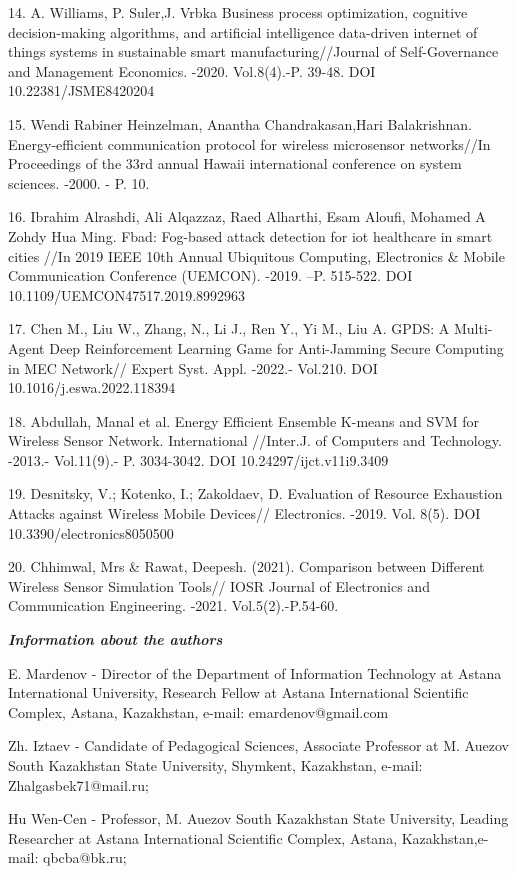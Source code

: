 14. A. Williams, P. Suler,J. Vrbka Business process optimization,
cognitive decision-making algorithms, and artificial intelligence
data-driven internet of things systems in sustainable smart
manufacturing//Journal of Self-Governance and Management Economics.
-2020. Vol.8(4).-P. 39-48. DOI 10.22381/JSME8420204

15. Wendi Rabiner Heinzelman, Anantha Chandrakasan,Hari Balakrishnan.
Energy-efficient communication protocol for wireless microsensor
networks//In Proceedings of the 33rd annual Hawaii international
conference on system sciences. -2000. - P. 10.

16. Ibrahim Alrashdi, Ali Alqazzaz, Raed Alharthi, Esam Aloufi, Mohamed
A Zohdy Hua Ming. Fbad: Fog-based attack detection for iot healthcare in
smart cities //In 2019 IEEE 10th Annual Ubiquitous Computing,
Electronics \& Mobile Communication Conference (UEMCON). -2019. --P.
515-522. DOI 10.1109/UEMCON47517.2019.8992963

17. Chen M., Liu W., Zhang, N., Li J., Ren Y., Yi M., Liu A. GPDS: A
Multi-Agent Deep Reinforcement Learning Game for Anti-Jamming Secure
Computing in MEC Network// Expert Syst. Appl. -2022.- Vol.210. DOI
10.1016/j.eswa.2022.118394

18. Abdullah, Manal et al. Energy Efficient Ensemble K-means and SVM for
Wireless Sensor Network. International //Inter.J. of Computers and
Technology. -2013.- Vol.11(9).- P. 3034-3042. DOI
10.24297/ijct.v11i9.3409

19. Desnitsky, V.; Kotenko, I.; Zakoldaev, D. Evaluation of Resource
Exhaustion Attacks against Wireless Mobile Devices// Electronics. -2019.
Vol. 8(5). DOI 10.3390/electronics8050500

20. Chhimwal, Mrs \& Rawat, Deepesh. (2021). Comparison between
Different Wireless Sensor Simulation Tools// IOSR Journal of Electronics
and Communication Engineering. -2021. Vol.5(2).-P.54-60.

\emph{{\bfseries Information about the authors}}

E. Mardenov - Director of the Department of Information Technology at
Astana International University, Research Fellow at Astana International
Scientific Complex, Astana, Kazakhstan, e-mail: emardenov@gmail.com

Zh. Iztaev - Candidate of Pedagogical Sciences, Associate Professor at
M. Auezov South Kazakhstan State University, Shymkent, Kazakhstan,
e-mail: Zhalgasbek71@mail.ru;

Hu Wen-Cen - Professor, M. Auezov South Kazakhstan State University,
Leading Researcher at Astana International Scientific Complex, Astana,
Kazakhstan,e-mail: qbcba@bk.ru;

